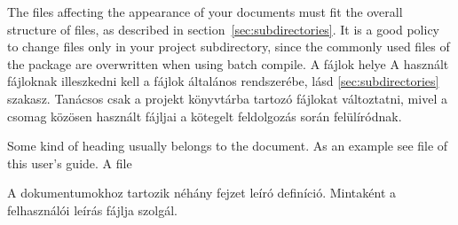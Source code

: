 {
The files affecting the appearance of your documents must fit the 
overall structure of files, as described in section~\ref{sec:subdirectories}.
It is a good policy to change files only in your project subdirectory,
since the commonly used files of the package are overwritten when using batch compile.
}
{A fájlok helye}
{
A használt fájloknak illeszkedni kell a fájlok általános rendszerébe,
lásd \ref{sec:subdirectories} szakasz.
Tanácsos csak a projekt könyvtárba tartozó fájlokat változtatni,
mivel a csomag közösen használt fájljai a kötegelt feldolgozás során
felülíródnak.
}


{
Some kind of heading usually belongs to the document.
As an example see file  of this user's guide.
}
{A  file}
{
A dokumentumokhoz tartozik néhány fejzet leíró definíció.
Mintaként a felhasználói leírás  fájlja szolgál.

}


